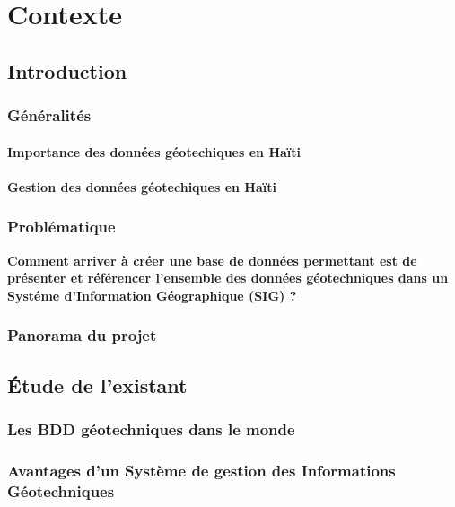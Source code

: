\chapter{Contexte}
\section{Introduction}
    \subsection{Généralités}
        \subsubsection{Importance des données géotechiques en Haïti}
          
        \subsubsection{Gestion des données géotechiques en Haïti}
            

    \subsection{Problématique}
    \textbf{Comment arriver à créer une base de données permettant est de 
    présenter et référencer l'ensemble des données géotechniques dans un Systéme
    d’Information Géographique (SIG) ?}

    \subsection{Panorama du projet}
        

\section{Étude de l'existant}
    \subsection{Les BDD géotechniques dans le monde}
        
    \subsection{Avantages d'un Système de gestion des Informations Géotechniques}
        

